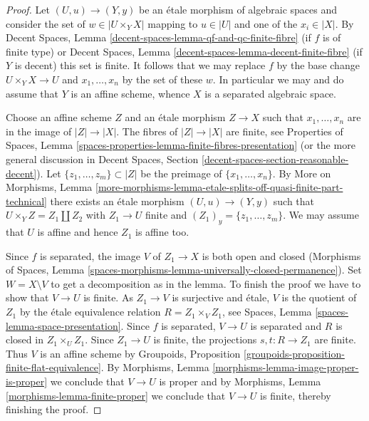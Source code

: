 \documentclass[10pt,a4paper]{amsart}
\theoremstyle{plain}
\theoremstyle{definition}
\theoremstyle{remark}
\numberwithin{equation}{subsection}
\begin{document}
\begin{proof}
Let $(U, u) \to (Y, y)$ be an \'etale morphism of algebraic spaces
and consider the set of  $w \in |U \times_Y X|$ mapping to $u \in |U|$
and one of the $x_i \in |X|$. By
Decent Spaces, Lemma \ref{decent-spaces-lemma-qf-and-qc-finite-fibre}
(if $f$ is of finite type) or
Decent Spaces, Lemma \ref{decent-spaces-lemma-decent-finite-fibre}
(if $Y$ is decent) this set is finite.
It follows that we may replace $f$ by the base change
$U \times_Y X \to U$ and $x_1, \ldots, x_n$ by the set of these $w$.
In particular we may and do assume that $Y$ is an affine scheme,
whence $X$ is a separated algebraic space.

\medskip\noindent
Choose an affine scheme $Z$ and an \'etale morphism $Z \to X$ such that
$x_1, \ldots, x_n$ are in the image of $|Z| \to |X|$. The fibres of
$|Z| \to |X|$ are finite, see Properties of Spaces, Lemma
\ref{spaces-properties-lemma-finite-fibres-presentation}
(or the more general discussion in Decent Spaces, Section
\ref{decent-spaces-section-reasonable-decent}).
Let $\{z_1, \ldots, z_m\} \subset |Z|$ be the preimage of
$\{x_1, \ldots, x_n\}$. By More on Morphisms, Lemma
\ref{more-morphisms-lemma-etale-splits-off-quasi-finite-part-technical}
there exists an \'etale morphism $(U, u) \to (Y, y)$ such
that $U \times_Y Z = Z_1 \amalg Z_2$ with $Z_1 \to U$ finite and
$(Z_1)_y = \{z_1, \ldots, z_m\}$. We may assume that $U$ is affine
and hence $Z_1$ is affine too.

\medskip\noindent
Since $f$ is separated, the image $V$ of $Z_1 \to X$ is both open and closed
(Morphisms of Spaces, Lemma
\ref{spaces-morphisms-lemma-universally-closed-permanence}).
Set $W = X \setminus V$ to get a decomposition as in the lemma.
To finish the proof we have to show that $V \to U$ is finite.
As $Z_1 \to V$ is surjective and \'etale, $V$ is the quotient of
$Z_1$ by the \'etale equivalence relation $R = Z_1 \times_V Z_1$, see
Spaces, Lemma \ref{spaces-lemma-space-presentation}.
Since $f$ is separated, $V \to U$ is separated and $R$ is closed in
$Z_1 \times_U Z_1$. Since $Z_1 \to U$ is finite,
the projections $s, t : R \to Z_1$ are finite.
Thus $V$ is an affine scheme by
Groupoids, Proposition \ref{groupoids-proposition-finite-flat-equivalence}.
By Morphisms, Lemma \ref{morphisms-lemma-image-proper-is-proper}
we conclude that $V \to U$ is proper and by
Morphisms, Lemma \ref{morphisms-lemma-finite-proper}
we conclude that $V \to U$ is finite,
thereby finishing the proof.
\end{proof}
\end{document}
